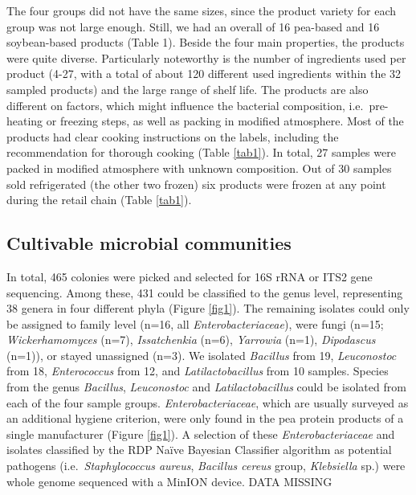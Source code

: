 \documentclass[preprint, 3p,
authoryear]{elsarticle} %
\begin{document}
The four groups did not have the same sizes, since the product variety
for each group was not large enough. Still, we had an overall of 16
pea-based and 16 soybean-based products (Table 1). Beside the four main
properties, the products were quite diverse. Particularly noteworthy is
the number of ingredients used per product (4-27, with a total of about
120 different used ingredients within the 32 sampled products) and the
large range of shelf life. The products are also different on factors,
which might influence the bacterial composition, i.e.~pre-heating or
freezing steps, as well as packing in modified atmosphere. Most of the
products had clear cooking instructions on the labels, including the
recommendation for thorough cooking (Table \ref{tab1}). In total, 27
samples were packed in modified atmosphere with unknown composition. Out
of 30 samples sold refrigerated (the other two frozen) six products were
frozen at any point during the retail chain (Table \ref{tab1}).

\hypertarget{cultivable-microbial-communities}{%
\subsection{Cultivable microbial
communities}\label{cultivable-microbial-communities}}

In total, 465 colonies were picked and selected for 16S rRNA or ITS2
gene sequencing. Among these, 431 could be classified to the genus
level, representing 38 genera in four different phyla (Figure
\ref{fig1}). The remaining isolates could only be assigned to family
level (n=16, all \emph{Enterobacteriaceae}), were fungi (n=15;
\emph{Wickerhamomyces} (n=7), \emph{Issatchenkia} (n=6), \emph{Yarrowia}
(n=1), \emph{Dipodascus} (n=1)), or stayed unassigned (n=3). We isolated
\emph{Bacillus} from 19, \emph{Leuconostoc} from 18, \emph{Enterococcus}
from 12, and \emph{Latilactobacillus} from 10 samples. Species from the
genus \emph{Bacillus}, \emph{Leuconostoc} and \emph{Latilactobacillus}
could be isolated from each of the four sample groups.
\emph{Enterobacteriaceae}, which are usually surveyed as an additional
hygiene criterion, were only found in the pea protein products of a
single manufacturer (Figure \ref{fig1}). A selection of these
\emph{Enterobacteriaceae} and isolates classified by the RDP Naïve
Bayesian Classifier algorithm as potential pathogens
(i.e.~\emph{Staphylococcus aureus}, \emph{Bacillus cereus} group,
\emph{Klebsiella} sp.) were whole genome sequenced with a MinION device.
DATA MISSING
\end{document}
